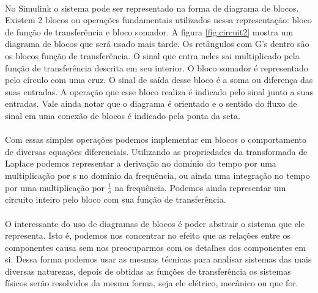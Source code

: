 \documentclass[a4paper,11pt]{article}
\begin{document}
\paragraph{}No Simulink o sistema pode ser representado na forma
de diagrama de blocos. Existem 2 blocos ou operações fundamentais
utilizados nessa representação: bloco de função de transferência e
bloco somador. A figura \ref{fig:circuit2} mostra um diagrama de blocos
que será usado mais tarde. Os retângulos com G's dentro são os blocos
função de transferência. O sinal que entra neles sai multiplicado pela 
função de transferência descrita em seu interior. O bloco somador é 
representado pelo círculo com uma cruz. O sinal de saída desse bloco 
é a soma ou diferença das suas entradas. A operação que esse bloco
realiza é indicado pelo sinal junto a suas entradas. Vale ainda notar
que o diagrama é orientado e o sentido do fluxo de sinal em uma conexão 
de blocos é indicado pela ponta da seta. 
 
 \paragraph{} Com essas simples operações podemos implementar em blocos
 o comportamento de diversas equações diferenciais. Utilizando as propriedades
 da transformada de Laplace podemos representar a derivação no domínio do tempo
 por uma multiplicação por s no domínio da frequência, ou ainda uma integração
 no tempo por uma multiplicação por $\frac{1}{s}$ na frequência. Podemos ainda
 representar um circuito inteiro pelo bloco com sua função de transferência.

\paragraph{} O interessante do uso de diagramas de blocos é poder
abstrair o sistema que ele representa. Isto é, podemos nos concentrar
no efeito que as relações entre os componentes causa sem nos preocuparmos
com os detalhes dos componentes em si. Dessa forma podemos usar as mesmas 
técnicas para analisar sistemas das mais diversas naturezas, depois
de obtidas as funções de transferência os sistemas físicos serão resolvidos
da mesma forma, seja ele elétrico, mecânico ou que for. 
\end{document}
